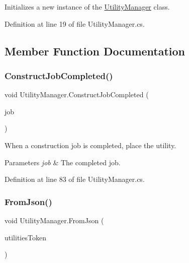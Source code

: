 Initializes a new instance of the \hyperlink{class_utility_manager}{Utility\+Manager} class. 



Definition at line 19 of file Utility\+Manager.\+cs.



\subsection{Member Function Documentation}
\mbox{\label{class_utility_manager_a6b0d4a143b6944fc6f539f1762ede9be}} 
\subsubsection{\texorpdfstring{Construct\+Job\+Completed()}{ConstructJobCompleted()}}
{\footnotesize\ttfamily void Utility\+Manager.\+Construct\+Job\+Completed (\begin{DoxyParamCaption}\item[{\hyperlink{class_job}{Job}}]{job }\end{DoxyParamCaption})}



When a construction job is completed, place the utility. 


\begin{DoxyParams}{Parameters}
{\em job} & The completed job.\\
\hline
\end{DoxyParams}


Definition at line 83 of file Utility\+Manager.\+cs.

\mbox{\label{class_utility_manager_aa5d5b53d6e90eb7463202e01e72ab5f1}} 
\subsubsection{\texorpdfstring{From\+Json()}{FromJson()}}
{\footnotesize\ttfamily void Utility\+Manager.\+From\+Json (\begin{DoxyParamCaption}\item[{J\+Token}]{utilities\+Token }\end{DoxyParamCaption})}



